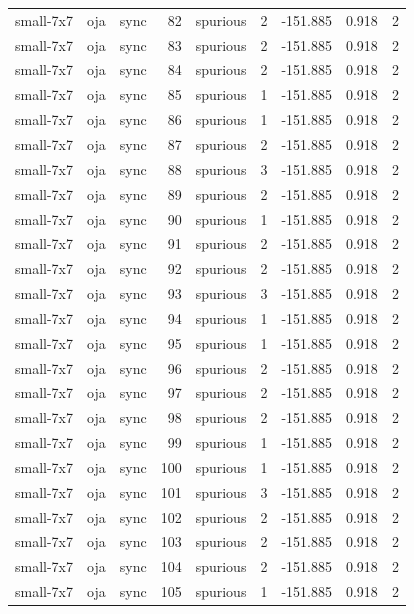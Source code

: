 \begin{tabular}{lllrlrrrr}
small-7x7 & oja & sync & 82 & spurious & 2 & -151.885 & 0.918 & 2 \\
small-7x7 & oja & sync & 83 & spurious & 2 & -151.885 & 0.918 & 2 \\
small-7x7 & oja & sync & 84 & spurious & 2 & -151.885 & 0.918 & 2 \\
small-7x7 & oja & sync & 85 & spurious & 1 & -151.885 & 0.918 & 2 \\
small-7x7 & oja & sync & 86 & spurious & 1 & -151.885 & 0.918 & 2 \\
small-7x7 & oja & sync & 87 & spurious & 2 & -151.885 & 0.918 & 2 \\
small-7x7 & oja & sync & 88 & spurious & 3 & -151.885 & 0.918 & 2 \\
small-7x7 & oja & sync & 89 & spurious & 2 & -151.885 & 0.918 & 2 \\
small-7x7 & oja & sync & 90 & spurious & 1 & -151.885 & 0.918 & 2 \\
small-7x7 & oja & sync & 91 & spurious & 2 & -151.885 & 0.918 & 2 \\
small-7x7 & oja & sync & 92 & spurious & 2 & -151.885 & 0.918 & 2 \\
small-7x7 & oja & sync & 93 & spurious & 3 & -151.885 & 0.918 & 2 \\
small-7x7 & oja & sync & 94 & spurious & 1 & -151.885 & 0.918 & 2 \\
small-7x7 & oja & sync & 95 & spurious & 1 & -151.885 & 0.918 & 2 \\
small-7x7 & oja & sync & 96 & spurious & 2 & -151.885 & 0.918 & 2 \\
small-7x7 & oja & sync & 97 & spurious & 2 & -151.885 & 0.918 & 2 \\
small-7x7 & oja & sync & 98 & spurious & 2 & -151.885 & 0.918 & 2 \\
small-7x7 & oja & sync & 99 & spurious & 1 & -151.885 & 0.918 & 2 \\
small-7x7 & oja & sync & 100 & spurious & 1 & -151.885 & 0.918 & 2 \\
small-7x7 & oja & sync & 101 & spurious & 3 & -151.885 & 0.918 & 2 \\
small-7x7 & oja & sync & 102 & spurious & 2 & -151.885 & 0.918 & 2 \\
small-7x7 & oja & sync & 103 & spurious & 2 & -151.885 & 0.918 & 2 \\
small-7x7 & oja & sync & 104 & spurious & 2 & -151.885 & 0.918 & 2 \\
small-7x7 & oja & sync & 105 & spurious & 1 & -151.885 & 0.918 & 2 \\

\end{tabular}
